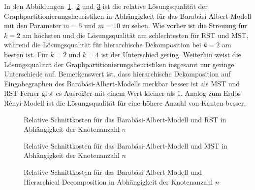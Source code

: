 In den Abbildungen~\ref{fig:prefattachrstnode},~\ref{fig:prefattachmstnode} und~\ref{fig:prefattachhdecompnode} ist die relative Lösungsqualität der Graphpartitionierungsheuristiken in Abhängigkeit für das Barabási-Albert-Modell mit den Parameter $m=5$ und $m=10$ zu sehen.
Wie vorher ist die Streuung für $k=2$ am höchsten und die Lösungsqualität am schlechtesten für RST und MST, während die Lösungsqualität für hierarchische Dekomposition bei $k=2$ am besten ist.
Für $k=2$ und $k=4$ ist der Unterschied gering.
Weiterhin weist die Lösungsqualitat der Graphpartitionierungsheuristiken insgesamt nur geringe Unterschiede auf.
Bemerkenswert ist, dass hierarchische Dekomposition auf Eingabegraphen des Barabási-Albert-Modells merkbar besser ist als MST und RST
Ferner gibt es Ausreißer mit einem Wert kleiner als $1$.
Analog zum Erdős-Rényi-Modell ist die Lösungsqualität für eine höhere Anzahl von Kanten besser.

\begin{figure}[H]
    \centering
    
    \caption{Relative Schnittkosten für das Barabási-Albert-Modell und RST in Abhängigkeit der Knotenanzahl $n$\label{fig:prefattachrstnode}}
\end{figure}

\begin{figure}[H]
    \centering
    
    \caption{Relative Schnittkosten für das Barabási-Albert-Modell und MST in Abhängigkeit der Knotenanzahl $n$\label{fig:prefattachmstnode}}
\end{figure}

\begin{figure}[H]
    \centering
    
    \caption{Relative Schnittkosten für das Barabási-Albert-Modell und Hierarchical Decomposition in Abhängigkeit der Knotenanzahl $n$\label{fig:prefattachhdecompnode}}
\end{figure}


%    
%
%    

